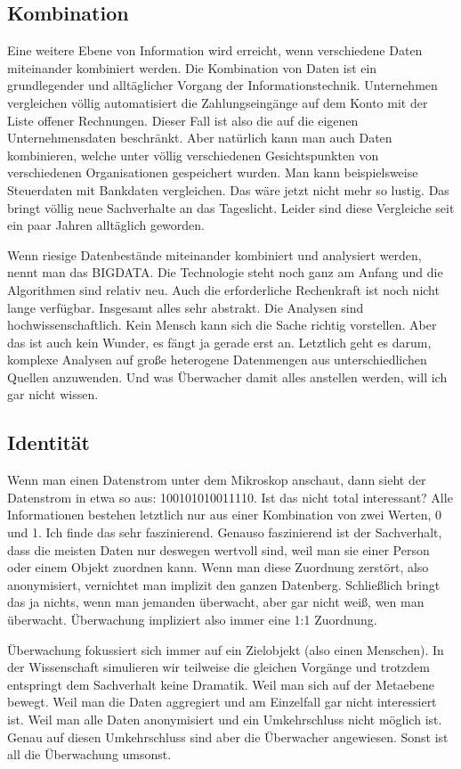 	\subsection{Kombination}
	Eine weitere Ebene von Information wird erreicht, wenn verschiedene Daten miteinander kombiniert werden. Die Kombination von Daten ist ein grundlegender und alltäglicher Vorgang der Informationstechnik. Unternehmen vergleichen völlig automatisiert die Zahlungseingänge auf dem Konto mit der Liste offener Rechnungen. Dieser Fall ist also die auf die eigenen Unternehmensdaten beschränkt. Aber natürlich kann man auch Daten kombinieren, welche unter völlig verschiedenen Gesichtspunkten von verschiedenen Organisationen gespeichert wurden. Man kann beispielsweise Steuerdaten mit Bankdaten vergleichen. Das wäre jetzt nicht mehr so lustig. Das bringt völlig neue Sachverhalte an das Tageslicht. Leider sind diese Vergleiche seit ein paar Jahren alltäglich geworden.
	
	Wenn riesige Datenbestände miteinander kombiniert und analysiert werden, nennt man das BIGDATA. Die Technologie steht noch ganz am Anfang und die Algorithmen sind relativ neu. Auch die erforderliche Rechenkraft ist noch nicht lange verfügbar. Insgesamt alles sehr abstrakt. Die Analysen sind hochwissenschaftlich. Kein Mensch kann sich die Sache richtig vorstellen. Aber das ist auch kein Wunder, es fängt ja gerade erst an. Letztlich geht es darum, komplexe Analysen auf große heterogene Datenmengen aus unterschiedlichen Quellen anzuwenden. Und was Überwacher damit alles anstellen werden, will ich gar nicht wissen.
	
	\subsection{Identität}
	Wenn man einen Datenstrom unter dem Mikroskop anschaut, dann sieht der Datenstrom in etwa so aus: 100101010011110. Ist das nicht total interessant? Alle Informationen bestehen letztlich nur aus einer Kombination von zwei Werten, 0 und 1. Ich finde das sehr faszinierend. Genauso faszinierend ist der Sachverhalt, dass die meisten Daten nur deswegen wertvoll sind, weil man sie einer Person oder einem Objekt zuordnen kann. Wenn man diese Zuordnung zerstört, also anonymisiert, vernichtet man implizit den ganzen Datenberg. Schließlich bringt das ja nichts, wenn man jemanden überwacht, aber gar nicht weiß, wen man überwacht. Überwachung impliziert also immer eine 1:1 Zuordnung.
	
	Überwachung fokussiert sich immer auf ein Zielobjekt (also einen Menschen). In der Wissenschaft simulieren wir teilweise die gleichen Vorgänge und trotzdem entspringt dem Sachverhalt keine Dramatik. Weil man sich auf der Metaebene bewegt. Weil man die Daten aggregiert und am Einzelfall gar nicht interessiert ist. Weil man alle Daten anonymisiert und ein Umkehrschluss nicht möglich ist. Genau auf diesen Umkehrschluss sind aber die Überwacher angewiesen. Sonst ist all die Überwachung umsonst.
	
